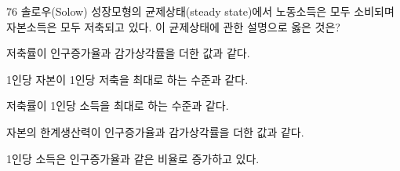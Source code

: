 \begin{question}{76}
솔로우(Solow) 성장모형의 균제상태(steady state)에서 노동소득은 모두 소비되며 자본소득은 모두 저축되고 있다. 이 균제상태에 관한 설명으로 옳은 것은?
\begin{choices}
  \item 저축률이 인구증가율과 감가상각률을 더한 값과 같다.
  \item 1인당 자본이 1인당 저축을 최대로 하는 수준과 같다.
  \item 저축률이 1인당 소득을 최대로 하는 수준과 같다.
  \item 자본의 한계생산력이 인구증가율과 감가상각률을 더한 값과 같다.
  \item 1인당 소득은 인구증가율과 같은 비율로 증가하고 있다.
\end{choices}
\end{question}

